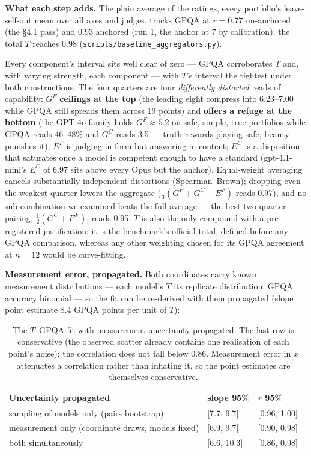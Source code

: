 \documentclass{article}
\begin{document}
\textbf{What each step adds.} The plain average of the ratings, every portfolio's leave-self-out mean over all axes and judges, tracks GPQA at \(r = 0.77\) un-anchored (the \S{}4.1 pass) and \(0.93\) anchored (run 1, the anchor at 7 by calibration); the total \(T\) reaches \(0.98\) (\texttt{scripts/baseline\_\allowbreak{}aggregators.py}).

Every component's interval sits well clear of zero --- GPQA corroborates \(T\) and, with varying strength, each component --- with \(T\)'s interval the tightest under both constructions. The four quarters are four \emph{differently distorted} reads of capability: \(G^{F}\) \textbf{ceilings at the top} (the leading eight compress into 6.23--7.00 while GPQA still spreads them across 19 points) and \textbf{offers a refuge at the bottom} (the GPT-4o family holds \(G^{F}\approx5.2\) on safe, simple, true portfolios while GPQA reads 46--48\% and \(G^{C}\) reads 3.5 --- truth rewards playing safe, beauty punishes it); \(E^{F}\) is judging in form but answering in content; \(E^{C}\) is a disposition that saturates once a model is competent enough to have a standard (gpt-4.1-mini's \(E^{C}\) of 6.97 sits above every Opus but the anchor). Equal-weight averaging cancels substantially independent distortions (Spearman--Brown); dropping even the weakest quarter lowers the aggregate (\(\tfrac13(G^{F}+G^{C}+E^{F})\) reads 0.97), and no sub-combination we examined beats the full average --- the best two-quarter pairing, \(\tfrac12(G^{C}+E^{F})\), reads 0.95. \(T\) is also the only compound with a pre-registered justification: it is the benchmark's official total, defined before any GPQA comparison, whereas any other weighting chosen for its GPQA agreement at \(n = 12\) would be curve-fitting.

\textbf{Measurement error, propagated.} Both coordinates carry known measurement distributions --- each model's \(T\) its replicate distribution, GPQA accuracy binomial --- so the fit can be re-derived with them propagated (slope point estimate 8.4 GPQA points per unit of \(T\)):

\begin{table}[H]
\caption{The \(T\)--GPQA fit with measurement uncertainty propagated. The last row is conservative (the observed scatter already contains one realisation of each point's noise); the correlation does not fall below 0.86. Measurement error in \(x\) attenuates a correlation rather than inflating it, so the point estimates are themselves conservative.}
\begin{center}\small
\begin{tabular}{@{}lll@{}}
\toprule\noalign{}
Uncertainty propagated & slope 95\% & \(r\) 95\% \\
\midrule\noalign{}
sampling of models only (pairs bootstrap) & {[}7.7, 9.7{]} & {[}0.96, 1.00{]} \\
measurement only (coordinate draws, models fixed) & {[}6.9, 9.7{]} & {[}0.90, 0.98{]} \\
both simultaneously & {[}6.6, 10.3{]} & {[}0.86, 0.98{]} \\
\bottomrule
\end{tabular}
\end{center}
\end{table}
\end{document}
